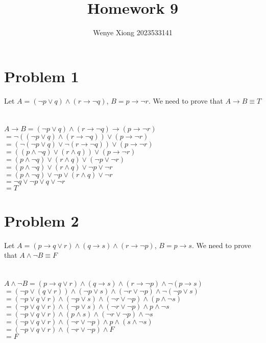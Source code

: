 \documentclass{article}
\author{Wenye Xiong 2023533141}
\title{Homework 9}
\begin{document}
\maketitle
\section{Problem 1}
Let $A = (\neg p \vee q) \wedge (r \rightarrow \neg q)$, $B = p \rightarrow \neg r$. We need to prove that $A \rightarrow B \equiv T$\\
\\ \hspace*{\fill} \\
$A \rightarrow B = (\neg p \vee q) \wedge (r \rightarrow \neg q) \rightarrow (p \rightarrow \neg r)$\\
$= \neg ((\neg p \vee q) \wedge (r \rightarrow \neg q)) \vee (p \rightarrow \neg r)$\\
$= (\neg (\neg p \vee q) \vee \neg (r \rightarrow \neg q)) \vee (p \rightarrow \neg r)$\\
$= ((p \wedge \neg q) \vee (r \wedge q)) \vee (p \rightarrow \neg r)$\\
$= (p \wedge \neg q) \vee (r \wedge q) \vee (\neg p \vee \neg r)$\\
$= (p \wedge \neg q) \vee (r \wedge q) \vee \neg p \vee \neg r$\\
$= (p \wedge \neg q) \vee \neg p \vee (r \wedge q) \vee \neg r$\\
$= \neg q \vee \neg p \vee q \vee \neg r$\\
$= T$\\
\section{Problem 2}
Let $A = (p \rightarrow q \vee r) \wedge (q \rightarrow s) \wedge (r \rightarrow \neg p)$, $B = p \rightarrow s$. We need to prove that $A \wedge \neg B \equiv F$\\
\\ \hspace*{\fill} \\
$A \wedge \neg B = (p \rightarrow q \vee r) \wedge (q \rightarrow s) \wedge (r \rightarrow \neg p) \wedge \neg (p \rightarrow s)$\\
$= (\neg p \vee (q \vee r)) \wedge (\neg p \vee s) \wedge (\neg r \vee \neg p) \wedge \neg (\neg p \vee s)$\\
$= (\neg p \vee q \vee r) \wedge (\neg p \vee s) \wedge (\neg r \vee \neg p) \wedge (p \wedge \neg s)$\\
$= (\neg p \vee q \vee r) \wedge (\neg p \vee s) \wedge (\neg r \vee \neg p) \wedge p \wedge \neg s$\\
$= (\neg p \vee q \vee r) \wedge (p \wedge s) \wedge (\neg r \vee \neg p) \wedge \neg s$\\
$= (\neg p \vee q \vee r) \wedge (\neg r \vee \neg p) \wedge p \wedge (s \wedge \neg s)$\\
$= (\neg p \vee q \vee r) \wedge (\neg r \vee \neg p) \wedge F$\\
$= F$\\
\end{document}
